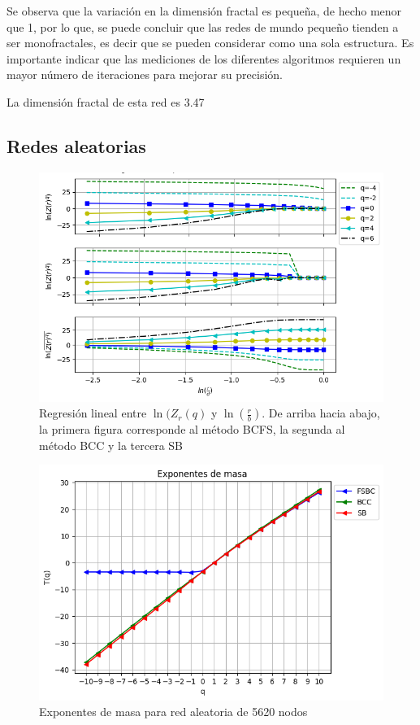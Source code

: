 Se observa que la variación en la dimensión fractal es pequeña, de hecho menor que 1, por lo que, se puede concluir que las redes de mundo pequeño tienden a ser monofractales, es decir que se pueden considerar como una sola estructura. Es importante indicar que las mediciones de los diferentes algoritmos requieren un mayor número de iteraciones para mejorar su precisión.

La dimensión fractal de esta red es 3.47

\subsection{Redes aleatorias}

\begin{figure}[H]
    \centering
    \includegraphics[scale=0.7]{Capitulo4Multifractalidad/imagenes/a_TqLnrBCrandom5620.png}
    \caption{Regresión lineal entre $\ln(Z_r(q)$ y $\ln(\frac{r}{b})$. De arriba hacia abajo, la primera figura corresponde al método BCFS, la segunda al método BCC y la tercera SB}
\end{figure}

\begin{figure}[H]
    \centering
    \includegraphics[scale=0.7]{Capitulo4Multifractalidad/imagenes/a_Tqrandom5620.png}
    \caption{Exponentes de masa para red aleatoria de 5620 nodos}
\end{figure}

